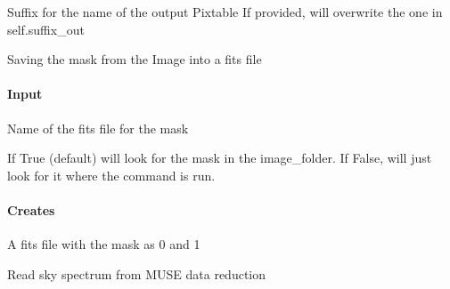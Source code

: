 \documentclass[letterpaper,10pt,english]{sphinxmanual}
\begin{document}
\begin{fulllineitems}
\begin{fulllineitems}
\begin{description}
\sphinxAtStartPar
Suffix for the name of the output Pixtable
If provided, will overwrite the one in self.suffix\_out

\end{description}

\end{fulllineitems}


\begin{fulllineitems}
\label{\detokenize{api/pymusepipe:pymusepipe.mpdaf_pipe.PixTableToMask.save_mask}}
\pysigstartsignatures
{}
\pysigstopsignatures
\sphinxAtStartPar
Saving the mask from the Image into a fits file


\paragraph{Input}
\label{\detokenize{api/pymusepipe:id100}}\begin{description}
\sphinxAtStartPar
Name of the fits file for the mask

\sphinxAtStartPar
If True (default) will look for the mask in the image\_folder.
If False, will just look for it where the command is run.

\end{description}


\paragraph{Creates}
\label{\detokenize{api/pymusepipe:id101}}
\sphinxAtStartPar
A fits file with the mask as 0 and 1

\end{fulllineitems}


\end{fulllineitems}


\begin{fulllineitems}
\label{\detokenize{api/pymusepipe:pymusepipe.mpdaf_pipe.get_sky_spectrum}}
\pysigstartsignatures
{}
\pysigstopsignatures
\sphinxAtStartPar
Read sky spectrum from MUSE data reduction

\end{fulllineitems}
\end{document}
